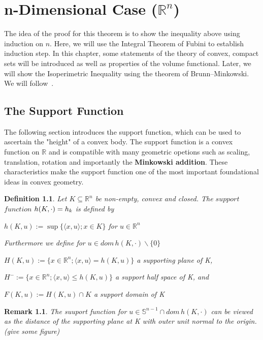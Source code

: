 \documentclass[a4paper]{book}
\newtheorem{remark}[theorem]{Remark}%
\newtheorem{definition}[theorem]{Definition}%
\numberwithin{theorem}{section}%
\begin{document}
\chapter{n-Dimensional Case ($\mathbb{R}^n$)}
The idea of the proof for this theorem is to show the inequality above using induction on $n$. Here, we will use the Integral Theorem of Fubini to establish induction step. In this chapter, some statements of the theory of convex, compact sets will be introduced as well as properties of the volume functional. Later, we will show the Isoperimetric Inequality using the theorem of Brunn–Minkowski. We will follow~\citep{schneider2014convex}.

\section{The Support Function}
The following section introduces the support function, which can be used to ascertain the "height" of a convex body. The support function is a convex function on $\mathbb{R}$ and is compatible with many geometric opetions such as scaling, translation, rotation and importantly the \textbf{Minkowski addition}. These characteristics make the support function one of the most important foundational ideas in convex geometry.

\begin{definition}
	Let $K\subseteq\mathbb{R}^n$ be non-empty, convex and closed. The $support$ $function$ $h(K,\cdot\space)=h_k$ is defined by
	\begin{center}
		$h(K,u):=\sup\{\langle x,u\rangle;x\in K\}$ for $u\in\mathbb{R}^n$
	\end{center}
	Furthermore we define for $u\in dom\,h(K,\cdot)\backslash\{0\}$
	\begin{center}
		$H(K,u):=\{x\in\mathbb{R}^n;\langle x,u\rangle=h(K,u)\}$ a supporting plane of K,
		
		$H^{-}:=\{x\in\mathbb{R}^n;\langle x,u\rangle\leq h(K,u)\}$ a support half space of K, and 
		
		$F(K,u):=H(K,u)\cap K$ a support domain of K
	\end{center}
\end{definition}

\begin{remark}
	The suuport function for $u\in\mathbb{S}^{n-1}\cap dom\,h(K,\cdot)$ can be viewed as the distance of the supporting plane at K with outer unit normal to the origin.(give some figure)
\end{remark}
\end{document}
